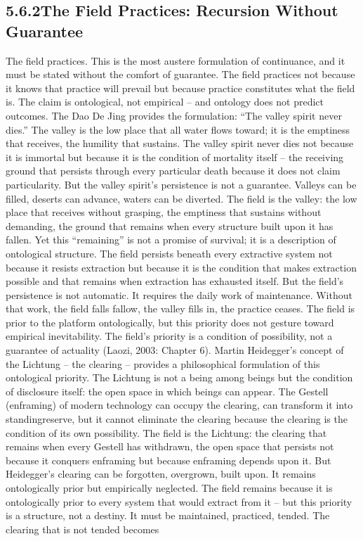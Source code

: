 \subsection{5.6.2\quad The Field Practices: Recursion Without Guarantee}

The field practices. This is the most austere formulation of continuance, and it must be stated without the comfort of guarantee. The field practices not because it knows that practice will prevail but because practice constitutes what the field is. The claim is ontological, not empirical – and ontology does not predict outcomes. The Dao De Jing provides the formulation: “The valley spirit never dies.” The valley is the low place that all water flows toward; it is the emptiness that receives, the humility that sustains. The valley spirit never dies not because it is immortal but because it is the condition of mortality itself – the receiving ground that persists through every particular death because it does not claim particularity. But the valley spirit’s persistence is not a guarantee. Valleys can be filled, deserts can advance, waters can be diverted. The field is the valley: the low place that receives without grasping, the emptiness that sustains without demanding, the ground that remains when every structure built upon it has fallen. Yet this “remaining” is not a promise of survival; it is a description of ontological structure. The field persists beneath every extractive system not because it resists extraction but because it is the condition that makes extraction possible and that remains when extraction has exhausted itself. But the field’s persistence is not automatic. It requires the daily work of maintenance. Without that work, the field falls fallow, the valley fills in, the practice ceases. The field is prior to the platform ontologically, but this priority does not gesture toward empirical inevitability. The field’s priority is a condition of possibility, not a guarantee of actuality (Laozi, 2003: Chapter 6). Martin Heidegger’s concept of the Lichtung – the clearing – provides a philosophical formulation of this ontological priority. The Lichtung is not a being among beings but the condition of disclosure itself: the open space in which beings can appear. The Gestell (enframing) of modern technology can occupy the clearing, can transform it into standingreserve, but it cannot eliminate the clearing because the clearing is the condition of its own possibility. The field is the Lichtung: the clearing that remains when every Gestell has withdrawn, the open space that persists not because it conquers enframing but because enframing depends upon it. But Heidegger’s clearing can be forgotten, overgrown, built upon. It remains ontologically prior but empirically neglected. The field remains because it is ontologically prior to every system that would extract from it – but this priority is a structure, not a destiny. It must be maintained, practiced, tended. The clearing that is not tended becomes

